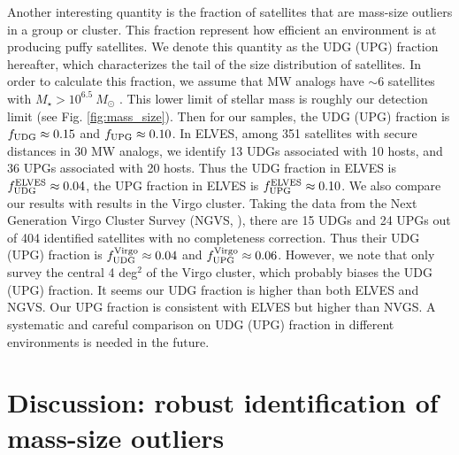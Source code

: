 \documentclass[twocolumn,astrosymb,twocolappendix]{aastex631}
\begin{document}
\begin{CJK*}{UTF8}{gbsn}
Another interesting quantity is the fraction of satellites that are mass-size outliers in a group or cluster. This fraction represent how efficient an environment is at producing puffy satellites. We denote this quantity as the UDG (UPG) fraction hereafter, which characterizes the tail of the size distribution of satellites. In order to calculate this fraction, we assume that MW analogs have $\sim 6$ satellites with $M_\star > 10^{6.5}\ M_\odot$ \citep{CarlstenELVES2022}. This lower limit of stellar mass is roughly our detection limit (see Fig. \ref{fig:mass_size}). Then for our samples, the UDG (UPG) fraction is $f_{\rm UDG} \approx 0.15$ and $f_{\rm UPG} \approx 0.10$. In ELVES, among 351 satellites with secure distances in 30 MW analogs, we identify 13 UDGs associated with 10 hosts, and 36 UPGs associated with 20 hosts. Thus the UDG fraction in ELVES is $f_{\rm UDG}^{\rm ELVES} \approx 0.04$, the UPG fraction in ELVES is $f_{\rm UPG}^{\rm ELVES} \approx 0.10$. We also compare our results with results in the Virgo cluster. Taking the data from the Next Generation Virgo Cluster Survey (NGVS, \citealt{Ferrarese2020}), there are 15 UDGs and 24 UPGs out of 404 identified satellites with no completeness correction. Thus their UDG (UPG) fraction is $f_{\rm UDG}^{\rm Virgo} \approx 0.04$ and $f_{\rm UPG}^{\rm Virgo} \approx 0.06$. However, we note that \citet{Ferrarese2020} only survey the central 4 deg$^2$ of the Virgo cluster, which probably biases the UDG (UPG) fraction. It seems our UDG fraction is higher than both ELVES and NGVS. Our UPG fraction is consistent with ELVES but higher than NVGS. A systematic and careful comparison on UDG (UPG) fraction in different environments is needed in the future. 

\section{Discussion: robust identification of mass-size outliers}\label{sec:discussion}




\end{CJK*}
\end{document}
